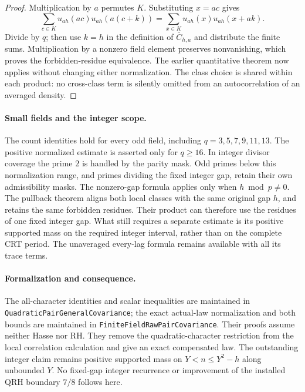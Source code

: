 \documentclass[11pt]{article}
\begin{document}
\begin{proof}
Multiplication by \(a\) permutes \(K\). Substituting \(x=ac\) gives
\[
 \sum_{c\in K}u_{ah}(ac)u_{ah}(a(c+k))
 =\sum_{x\in K}u_{ah}(x)u_{ah}(x+ak).
\]
Divide by \(q\); then use \(k=h\) in the definition of
\(\overline C_{h,a}\) and distribute the finite sums.
Multiplication by a nonzero field element preserves nonvanishing, which
proves the forbidden-residue equivalence. The earlier quantitative theorem
now applies without changing either normalization.
The class choice is shared within each product: no cross-class term is
silently omitted from an autocorrelation of an averaged density.
\end{proof}

\paragraph{Small fields and the integer scope.}
The count identities hold for every odd field, including
\(q=3,5,7,9,11,13\). The positive normalized estimate is asserted only
for \(q\ge16\). In integer divisor coverage the prime \(2\) is handled
by the parity mask. Odd primes below this normalization range, and
primes dividing the fixed integer gap, retain their own admissibility
masks. The nonzero-gap formula applies only when \(h\bmod p\ne0\).
The pullback theorem aligns both local classes with the same original
gap \(h\), and retains the same forbidden residues. Their product can
therefore use the residues of one fixed integer gap. What still requires
a separate estimate is its positive supported mass on the required
integer interval, rather than on the complete CRT period.
The unaveraged every-lag formula remains available with all its trace terms.

\paragraph{Formalization and consequence.}
The all-character identities and scalar inequalities are maintained
in \texttt{QuadraticPairGeneralCovariance}; the exact actual-law
normalization and both bounds are maintained in
\texttt{FiniteFieldRawPairCovariance}. Their proofs assume neither
Hasse nor RH. They remove the quadratic-character restriction from
the local correlation calculation and give an exact compensated law.
The outstanding integer claim remains positive supported mass on
\(Y<n\le Y^2-h\) along unbounded \(Y\). No fixed-gap integer recurrence
or improvement of the installed QRH boundary \(7/8\) follows here.
\end{document}
